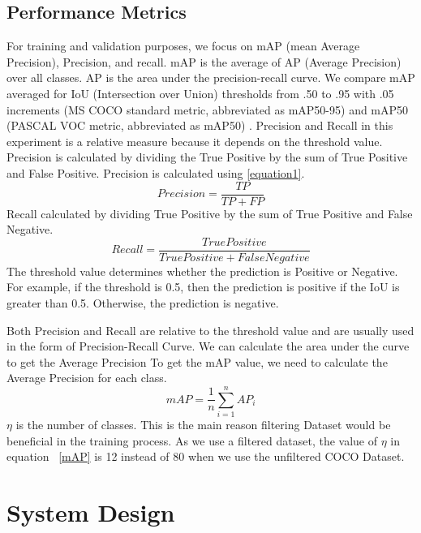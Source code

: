 \documentclass[conference]{IEEEtran}
\begin{document}
\subsection{Performance Metrics}
For training and validation purposes, we focus on mAP (mean Average Precision), Precision, and recall. mAP is the average of AP (Average Precision) over all classes. AP is the area under the precision-recall curve.
We compare mAP averaged for IoU (Intersection over Union) thresholds from .50 to .95 with .05 increments (MS COCO standard metric, abbreviated as mAP50-95) and mAP50 (PASCAL VOC metric, abbreviated as mAP50) \cite{lin2014microsoft}. 
Precision and Recall in  this experiment is a relative measure because it depends on the threshold value.
Precision is calculated by dividing the True Positive by the sum of True Positive and False Positive. 
Precision is calculated using \eqref{equation1}.
\begin{equation}
Precision = \frac{TP}{TP+FP}
\label{equation1}
\end{equation}
Recall calculated by dividing True Positive by the sum of True Positive and False Negative.
\begin{equation}
Recall = \frac{True Positive}{TruePositive+FalseNegative}
\end{equation}
The threshold value determines whether the prediction is Positive or Negative. For example, if the threshold is 0.5, then the prediction is positive if the IoU is greater than 0.5. Otherwise, the prediction is negative.

Both Precision and Recall are relative to the threshold value and are usually used in the form of Precision-Recall Curve. We can calculate the area under the curve to get the Average Precision
To get the mAP value, we need to calculate the Average Precision for each class.
\begin{equation}
mAP = \frac{1}{n}\sum_{i=1}^{n}AP_i
\label{mAP}
\end{equation}
$\eta$ is the number of classes.
This is the main reason filtering Dataset would be beneficial in the training process. As we use a filtered dataset, the value of $\eta$ in equation ~\ref{mAP} is 12 instead of 80 when we use the unfiltered COCO Dataset.


\section{System Design}
\end{document}
